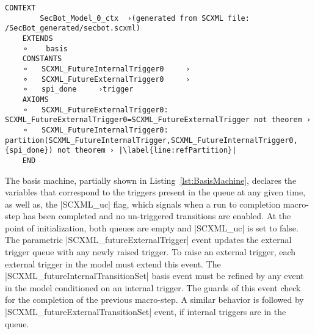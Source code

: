 \begin{lstlisting}[caption={Context for intrusion detection system abstract model},label={lst:SecBotCont0}, language=Event-B, escapechar=|, frame=single]
	CONTEXT
		SecBot_Model_0_ctx 	›(generated from SCXML file: /SecBot_generated/secbot.scxml)
	EXTENDS
	⚬	 basis 
	CONSTANTS
	⚬	SCXML_FutureInternalTrigger0	 ›
	⚬	SCXML_FutureExternalTrigger0	 ›
	⚬	spi_done	 ›trigger
	AXIOMS
	⚬	SCXML_FutureExternalTrigger0:	SCXML_FutureExternalTrigger0=SCXML_FutureExternalTrigger not theorem ›
	⚬	SCXML_FutureInternalTrigger0:	partition(SCXML_FutureInternalTrigger,SCXML_FutureInternalTrigger0,{spi_done}) not theorem › |\label{line:refPartition}|
	END
\end{lstlisting}

The basis machine, partially shown in Listing~\ref{lst:BasisMachine}, declares the variables that correspond to the triggers present in the queue at any given time, as well as, the |SCXML_uc| flag, which signals when a run to completion macro-step has been completed and no un-triggered transitions are enabled. 
At the point of initialization, both queues are empty and |SCXML_uc| is set to false. 
The parametric |SCXML_futureExternalTrigger| event updates the external trigger queue with any newly raised trigger. 
To raise an external trigger, each external trigger in the model must extend this event. 
The |SCXML_futureInternalTransitionSet| basis event must be refined by any event in the model conditioned on an internal trigger. 
The guards of this event check for the completion of the previous macro-step. 
A similar behavior is followed by |SCXML_futureExternalTransitionSet| event, if internal triggers are in the queue.  



